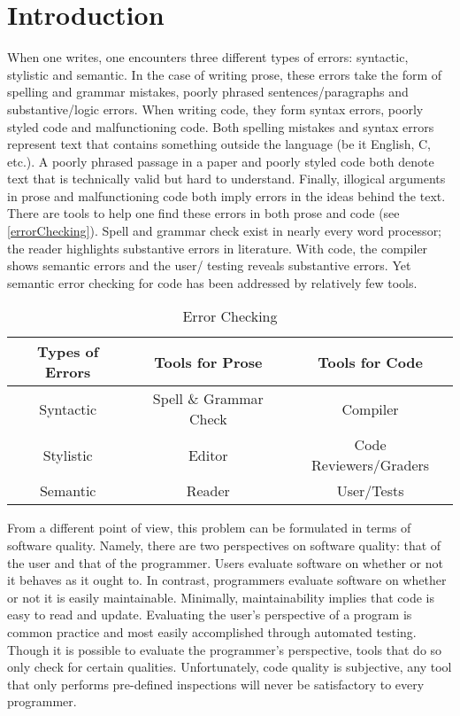 \documentclass[12pt]{report}
\begin{document}
\tableofcontents
\listoftables
\listoffigures

\cleardoublepage
{}
\pagestyle{fancy}
\doublespacing

\chapter{Introduction}

When one writes, one encounters three different types of errors: syntactic, stylistic and semantic.  
In the case of writing prose, these errors take the form of spelling and grammar mistakes, poorly phrased 
sentences\slash paragraphs and substantive\slash logic errors. When writing code, they form syntax 
errors, poorly styled code and malfunctioning code. Both spelling mistakes and syntax errors represent 
text that contains something outside the language (be it English, C, etc.). A poorly phrased passage in a 
paper and poorly styled code both denote text that is technically valid but hard to understand. Finally, 
illogical arguments in prose and malfunctioning code both imply errors in the ideas behind the text. 
There are tools to help one find these errors in both prose and code (see \autoref{errorChecking}). 
Spell and grammar check exist in nearly every word processor; the reader highlights substantive 
errors in literature. With code, the compiler shows semantic errors and the user\slash 
testing reveals substantive errors. Yet semantic error checking for code has been addressed by 
relatively few tools. 

\begin{table}%
	\begin{center}
	\begin{tabular}{ccc}
		\toprule
		Types of Errors & Tools for Prose & Tools for Code \\
		\midrule
		Syntactic & Spell \& Grammar Check & Compiler \\
		Stylistic & Editor & Code Reviewers\slash Graders \\ 
		Semantic & Reader & User\slash Tests \\
		\bottomrule
	\end{tabular}
	\end{center}
	\caption{Error Checking}
	\label{errorChecking}
\end{table}


From a different point of view, this problem can be formulated in terms of software quality. 
Namely, there are two perspectives on software quality: that of the user and that of the programmer. 
Users evaluate software on whether or not it behaves as it ought to. In contrast, programmers evaluate 
software on whether or not it is easily maintainable. Minimally, maintainability implies that 
code is easy to read and update. Evaluating the user's perspective of a program is common practice and 
most easily accomplished through automated testing. Though it is possible to evaluate the programmer's 
perspective, tools that do so only check for certain qualities. Unfortunately, code quality is 
subjective, any tool that only performs pre-defined inspections will never be satisfactory to every 
programmer.
\end{document}
